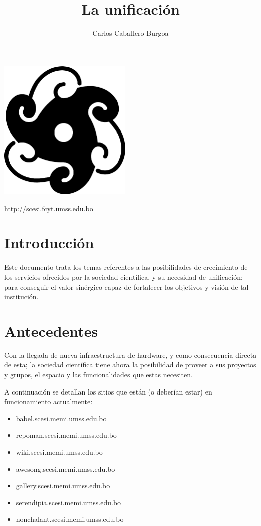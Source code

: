 \documentclass[letter,12pt]{article}
\title{\bf La unificación}
\author{Carlos Caballero Burgoa}
\begin{document}
\maketitle
\begin{center}\includegraphics[width=0.48\textwidth]{yachay.png}\end{center}
\begin{center}\url {http://scesi.fcyt.umss.edu.bo}\end{center}
\pagebreak

\tableofcontents
\pagebreak

\section{Introducción}
Este documento trata los temas referentes a las posibilidades de crecimiento de los servicios ofrecidos por la sociedad científica, y su necesidad de unificación; para conseguir el valor sinérgico capaz de fortalecer los objetivos y visión de tal institución.

\section{Antecedentes}
Con la llegada de nueva infraestructura de hardware, y como consecuencia directa de esta; la sociedad científica tiene ahora la posibilidad de proveer a sus proyectos y grupos, el espacio y
las funcionalidades que estas necesiten.

A continuación se detallan los sitios que están (o deberían estar) en funcionamiento actualmente:

\begin{itemize}
\item babel.scesi.memi.umss.edu.bo
\item repoman.scesi.memi.umss.edu.bo
\item wiki.scesi.memi.umss.edu.bo
\item awesong.scesi.memi.umss.edu.bo
\item gallery.scesi.memi.umss.edu.bo
\item serendipia.scesi.memi.umss.edu.bo
\item nonchalant.scesi.memi.umss.edu.bo
\end{itemize}
\end{document}
